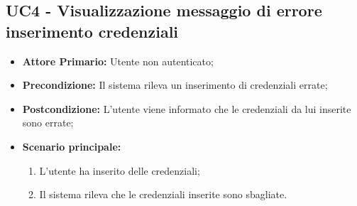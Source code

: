 \subsection{UC4 - Visualizzazione messaggio di errore inserimento credenziali}
\label{UC4}
\begin{itemize}
\item \textbf{Attore Primario:} Utente non autenticato;
\item \textbf{Precondizione:} Il sistema rileva un inserimento di credenziali errate;
\item \textbf{Postcondizione:} L'utente viene informato che le credenziali da lui inserite sono errate;
\item \textbf{Scenario principale:}
    \begin{enumerate}
    \item L'utente ha inserito delle credenziali;
    \item Il sistema rileva che le credenziali inserite sono sbagliate.
    \end{enumerate}
\end{itemize}